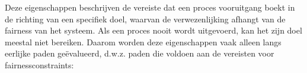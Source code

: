 \documentclass{article}
\begin{document}
	
	Deze eigenschappen beschrijven de vereiste dat een proces vooruitgang boekt in de richting van een specifiek doel, waarvan de verwezenlijking afhangt van de fairness van het systeem. Als een proces nooit wordt uitgevoerd, kan het zijn doel meestal niet bereiken. Daarom worden deze eigenschappen vaak alleen langs eerlijke paden geëvalueerd, d.w.z. paden die voldoen aan de   vereisten voor fairnessconstraints:
	
	
\end{document}
